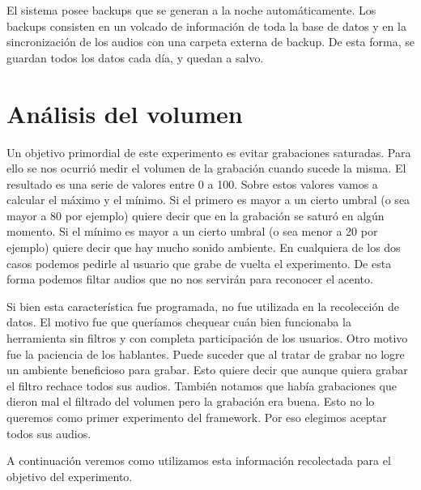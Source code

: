 El sistema posee backups que se generan a la noche automáticamente. Los backups consisten en un volcado de información de toda la base de datos y en la sincronización de los audios con una carpeta externa de backup. De esta forma, se guardan todos los datos cada día, y quedan a salvo.

\section{Análisis del volumen}

Un objetivo primordial de este experimento es evitar grabaciones saturadas. Para ello se nos ocurrió medir el volumen de la grabación cuando sucede la misma. El resultado es una serie de valores entre 0 a 100. Sobre estos valores vamos a calcular el máximo y el mínimo. Si el primero es mayor a un cierto umbral (o sea mayor a 80 por ejemplo) quiere decir que en la grabación se saturó en algún momento. Si el mínimo es mayor a un cierto umbral (o sea menor a 20 por ejemplo) quiere decir que hay mucho sonido ambiente. En cualquiera de los dos casos podemos pedirle al usuario que grabe de vuelta el experimento. De esta forma podemos filtar audios que no nos servirán para reconocer el acento.

Si bien esta característica fue programada, no fue utilizada en la recolección de datos. El motivo fue que queríamos chequear cuán bien funcionaba la herramienta sin filtros y con completa participación de los usuarios. Otro motivo fue la paciencia de los hablantes. Puede suceder que al tratar de grabar no logre un ambiente beneficioso para grabar. Esto quiere decir que aunque quiera grabar el filtro rechace todos sus audios. También notamos que había grabaciones que dieron mal el filtrado del volumen pero la grabación era buena. Esto no lo queremos como primer experimento del framework. Por eso elegimos aceptar todos sus audios.

A continuación veremos como utilizamos esta información recolectada para el objetivo del experimento.